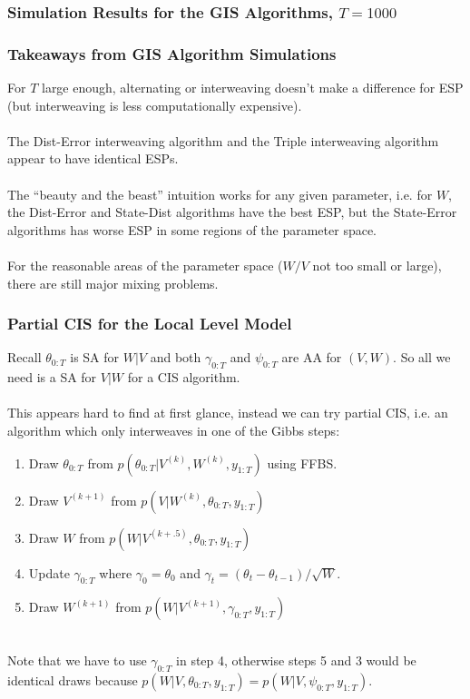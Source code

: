 \documentclass[xcolor=dvipsnames]{beamer}
\begin{document}
\begin{frame}
    \frametitle{Simulation Results for the GIS Algorithms, $T=1000$}
    
\end{frame}

\begin{frame}
  \frametitle{Takeaways from GIS Algorithm Simulations}
  For $T$ large enough, alternating or interweaving doesn't make a difference for ESP (but interweaving is less computationally expensive).\\~\\
  
  The Dist-Error interweaving algorithm and the Triple interweaving algorithm appear to have identical ESPs.\\~\\
\pause  
  The ``beauty and the beast'' intuition works for any given parameter, i.e. for $W$, the Dist-Error and State-Dist algorithms have the best ESP, but the State-Error algorithms has worse ESP in some regions of the parameter space.\\~\\
  
  For the reasonable areas of the parameter space ($W/V$ not too small or large), there are still major mixing problems.
\end{frame}

\begin{frame}
  \frametitle{Partial CIS for the Local Level Model}
  Recall $\theta_{0:T}$ is SA for $W|V$ and both $\gamma_{0:T}$ and $\psi_{0:T}$ are AA for $(V,W)$. So all we need is a SA for $V|W$ for a CIS algorithm.\\~\\
\pause  
  This appears hard to find at first glance, instead we can try partial CIS, i.e. an algorithm which only interweaves in one of the Gibbs steps:
  \begin{enumerate}
  \item Draw $\theta_{0:T}$ from $p(\theta_{0:T}|V^{(k)},W^{(k)},y_{1:T})$ using FFBS.
  \item Draw $V^{(k+1)}$ from $p(V|W^{(k)},\theta_{0:T},y_{1:T})$
  \item Draw $W$ from $p(W|V^{(k+.5)},\theta_{0:T},y_{1:T})$
  \item Update $\gamma_{0:T}$ where $\gamma_0=\theta_0$ and $\gamma_t=(\theta_t-\theta_{t-1})/\sqrt{W}$.
  \item Draw $W^{(k+1)}$ from $p(W|V^{(k+1)},\gamma_{0:T},y_{1:T})$\\~\\
  \end{enumerate}
  Note that we have to use $\gamma_{0:T}$ in step 4, otherwise steps 5 and 3 would be identical draws because $p(W|V,\theta_{0:T},y_{1:T})=p(W|V,\psi_{0:T},y_{1:T})$.
\end{frame}
\end{document}
